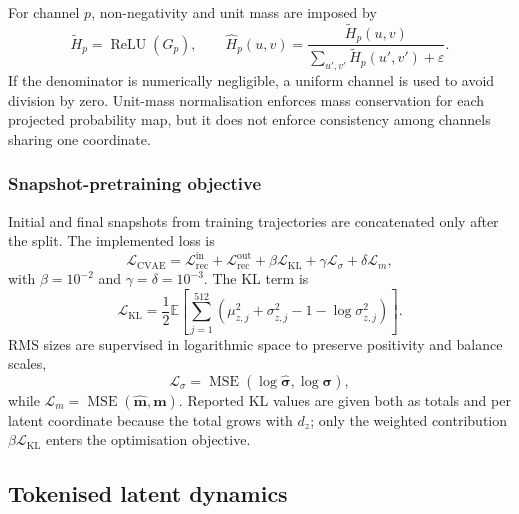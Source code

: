 For channel $p$, non-negativity and unit mass are imposed by
\begin{equation}
    \widetilde{H}_p
    =
    \operatorname{ReLU}(G_p),
    \qquad
    \widehat{H}_p(u,v)
    =
    \frac{\widetilde{H}_p(u,v)}
    {\sum_{u',v'}\widetilde{H}_p(u',v')+\varepsilon}.
    \label{eq:cvae_channel_normalisation}
\end{equation}
If the denominator is numerically negligible, a uniform channel is used to avoid division by zero. Unit-mass normalisation enforces mass conservation for each projected probability map, but it does not enforce consistency among channels sharing one coordinate.

\subsubsection{Snapshot-pretraining objective}

Initial and final snapshots from training trajectories are concatenated only after the split. The implemented loss is
\begin{equation}
    \mathcal{L}_{\mathrm{CVAE}}
    =
    \mathcal{L}_{\mathrm{rec}}^{\mathrm{in}}
    +
    \mathcal{L}_{\mathrm{rec}}^{\mathrm{out}}
    +
    \beta\mathcal{L}_{\mathrm{KL}}
    +
    \gamma\mathcal{L}_{\sigma}
    +
    \delta\mathcal{L}_{m},
    \label{eq:cvae_complete_loss}
\end{equation}
with $\beta=10^{-2}$ and $\gamma=\delta=10^{-3}$. The KL term is
\begin{equation}
    \mathcal{L}_{\mathrm{KL}}
    =
    \frac{1}{2}
    \mathbb{E}
    \left[
        \sum_{j=1}^{512}
        \left(
            \mu_{z,j}^{2}
            +\sigma_{z,j}^{2}
            -1
            -\log\sigma_{z,j}^{2}
        \right)
    \right].
    \label{eq:cvae_kl_loss}
\end{equation}
RMS sizes are supervised in logarithmic space to preserve positivity and balance scales,
\begin{equation}
    \mathcal{L}_{\sigma}
    =
    \operatorname{MSE}
    \left(
        \log\widehat{\bm\sigma},
        \log\bm\sigma
    \right),
\end{equation}
while $\mathcal{L}_m=\operatorname{MSE}(\widehat{\bm m},\bm m)$. Reported KL values are given both as totals and per latent coordinate because the total grows with $d_z$; only the weighted contribution $\beta\mathcal{L}_{\mathrm{KL}}$ enters the optimisation objective.

\subsection{Tokenised latent dynamics}
\label{subsec:tokenized_latent_dynamics}

